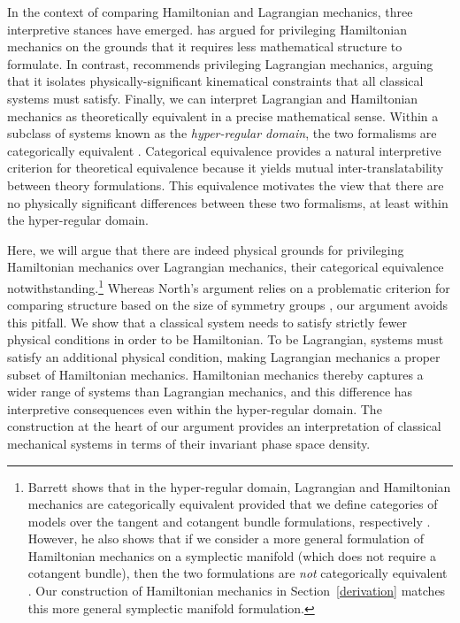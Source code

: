\documentclass[12pt, twoside]{article}
\begin{document}
In the context of comparing Hamiltonian and Lagrangian mechanics, three interpretive stances have emerged. \textcites[]{North} has argued for privileging Hamiltonian mechanics on the grounds that it requires less mathematical structure to formulate. In contrast, \textcites[]{Curiel} recommends privileging Lagrangian mechanics, arguing that it isolates physically-significant kinematical constraints that all classical systems must satisfy. Finally, we can interpret Lagrangian and Hamiltonian mechanics as theoretically equivalent in a precise mathematical sense. Within a subclass of systems known as the \textit{hyper-regular domain}, the two formalisms are categorically equivalent \parencites[]{Teh}{Barrett2}. Categorical equivalence provides a natural interpretive criterion for theoretical equivalence because it yields mutual inter-translatability between theory formulations. This equivalence motivates the view that there are no physically significant differences between these two formalisms, at least within the hyper-regular domain. 

Here, we will argue that there are indeed physical grounds for privileging Hamiltonian mechanics over Lagrangian mechanics, their categorical equivalence notwithstanding.\footnote{Barrett shows that in the hyper-regular domain, Lagrangian and Hamiltonian mechanics are categorically equivalent provided that we define categories of models over the tangent and cotangent bundle formulations, respectively \parencites*[1181-82]{Barrett2}. However, he also shows that if we consider a more general formulation of Hamiltonian mechanics on a symplectic manifold (which does not require a cotangent bundle), then the two formulations are \textit{not} categorically equivalent \parencites*[1182-83]{Barrett2}. Our construction of Hamiltonian mechanics in Section~\ref{derivation} matches this more general symplectic manifold formulation.} Whereas North's argument relies on a problematic criterion for comparing structure based on the size of symmetry groups \parencites[]{Swanson}, our argument avoids this pitfall. We show that a classical system needs to satisfy strictly fewer physical conditions in order to be Hamiltonian. To be Lagrangian, systems must satisfy an additional physical condition, making Lagrangian mechanics a proper subset of Hamiltonian mechanics. Hamiltonian mechanics thereby captures a wider range of systems than Lagrangian mechanics, and this difference has interpretive consequences even within the hyper-regular domain. The construction at the heart of our argument provides an interpretation of classical mechanical systems in terms of their invariant phase space density. 
\end{document}

